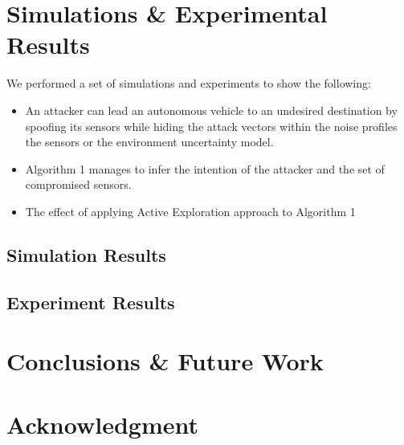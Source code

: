 \documentclass[conference]{IEEEtran}
\begin{document}
\section{Simulations \& Experimental Results}\label{sec:conclusion}
We performed a set of simulations and experiments to show the following:
\begin{itemize}
    \item An attacker can lead an autonomous vehicle to an undesired destination by spoofing its sensors while hiding the attack vectors within the noise profiles the sensors or the environment uncertainty model.
    \item Algorithm 1 manages to infer the intention of the attacker and the set of compromised sensors.
    \item The effect of applying Active Exploration approach to Algorithm 1
\end{itemize}
\subsection{Simulation Results}

\subsection{Experiment Results}
\section{Conclusions \& Future Work}\label{sec:conclusion}




\section*{Acknowledgment}







%
%
%




\end{document}
